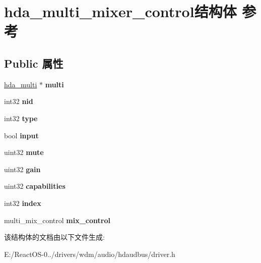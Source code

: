\hypertarget{structhda__multi__mixer__control}{}\section{hda\+\_\+multi\+\_\+mixer\+\_\+control结构体 参考}
\label{structhda__multi__mixer__control}
\subsection*{Public 属性}
\begin{DoxyCompactItemize}
\item 
\mbox{\label{structhda__multi__mixer__control_a081b00ec4faf6070eaf96a5216bf212e}} 
\hyperlink{structhda__multi}{hda\+\_\+multi} $\ast$ {\bfseries multi}
\item 
\mbox{\label{structhda__multi__mixer__control_a7726da8a12ba77765dc03010a5c87aa8}} 
int32 {\bfseries nid}
\item 
\mbox{\label{structhda__multi__mixer__control_ae06b5d3a0bec890fc1d39785e51839fa}} 
int32 {\bfseries type}
\item 
\mbox{\label{structhda__multi__mixer__control_a7970faa17d711f95ca078ae9db0a1920}} 
bool {\bfseries input}
\item 
\mbox{\label{structhda__multi__mixer__control_ae83087915e31d51696ebee7ba5c75f90}} 
uint32 {\bfseries mute}
\item 
\mbox{\label{structhda__multi__mixer__control_a4114b37e887f16577bdddf35628201b1}} 
uint32 {\bfseries gain}
\item 
\mbox{\label{structhda__multi__mixer__control_ae1aa6838f5bb91d715dca44c56e6b213}} 
uint32 {\bfseries capabilities}
\item 
\mbox{\label{structhda__multi__mixer__control_a5b94480109a4be34dfa9985152b64033}} 
int32 {\bfseries index}
\item 
\mbox{\label{structhda__multi__mixer__control_a89e99e9dc4d9162e9b8e5d28613220a7}} 
multi\+\_\+mix\+\_\+control {\bfseries mix\+\_\+control}
\end{DoxyCompactItemize}


该结构体的文档由以下文件生成\+:\begin{DoxyCompactItemize}
\item 
E\+:/\+React\+O\+S-\/0../drivers/wdm/audio/hdaudbus/driver.\+h\end{DoxyCompactItemize}
